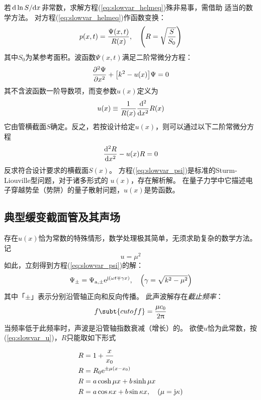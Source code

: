 \documentclass[UTF8]{ctexbook}
\begin{document}
若$\dv*{\ln S}{x}$非常数，求解方程(\ref{eq:slowvar_helmeq})殊非易事，需借助
适当的数学方法。
对方程(\ref{eq:slowvar_helmeq})作函数变换：
\begin{equation}
	\label{eq:slowvar_ppsi}
	p(x,t) = \frac{\Psi(x,t)}{R(x)}\qc \qty(R=\sqrt{\frac{S}{S_0}})
\end{equation}
其中$S_0$为某参考面积。波函数$\Psi(x,t)$满足二阶常微分方程：
\begin{equation}
	\label{eq:slowvar_psi}
	\pdv[2]{\Psi}{x} +\qty[k^2-u(x)]\Psi=0
\end{equation}
其不含波函数一阶导数项，而变参数$u(x)$定义为
\begin{equation}
	\label{eq:slowvar_u}
	u(x) \equiv \frac{1}{R(x)} \dv[2]{x} R(x)
\end{equation}
它由管横截面$S$确定。反之，若按设计给定$u(x)$，则可以通过以下二阶常微分方程
\begin{equation}
	\dv[2]{R}{x} - u(x)R=0
\end{equation}
反求符合设计要求的横截面$S(x)$。
方程(\ref{eq:slowvar_psi})是标准的Sturm-Liouville型问题，对于诸多形式的
$u(x)$，存在解析解。
在量子力学中它描述电子穿越势垒（势阱）的量子散射问题，$u(x)$是势函数。

\subsection{典型缓变截面管及其声场}
存在$u(x)$恰为常数的特殊情形，数学处理极其简单，无须求助复杂的数学方法。
记
$$u=\mu^2$$
如此，立刻得到方程(\ref{eq:slowvar_psi})的解：
\begin{equation}
	\label{eq:slowvar_psipm}
	\Psi_\pm = \Psi_{\mathrm{a},\pm} \me^{\mj(\omega t\mp \gamma x)}
	\qc \qty(\gamma = \sqrt{k^2-\mu^2})
\end{equation}
其中「$\pm$」表示分别沿管轴正向和反向传播。
此声波解存在\emph{截止频率}：
$$
f\subt{cutoff} = \frac{\mu c_0}{2\uppi}
$$
当频率低于此频率时，声波是沿管轴指数衰减（增长）的。
欲使$u$恰为此常数，按(\ref{eq:slowvar_u})，$R$只能取如下形式

\begin{subequations}
	\label{eq:slowvar_R}
	\begin{align}
		R & = 1+\frac{x}{x_0}\\
		R& = R_0 \me^{\pm \mu(x-x_0)} \label{eq:slowvar_Rexp} \\
		R&=a\cosh \mu x +b\sinh \mu x \label{eq:slowvar_Rcat}\\
		R& = a\cos \kappa x + b\sin \kappa x\qc (\mu = \mj \kappa)
	\end{align}
\end{subequations}
\end{document}
